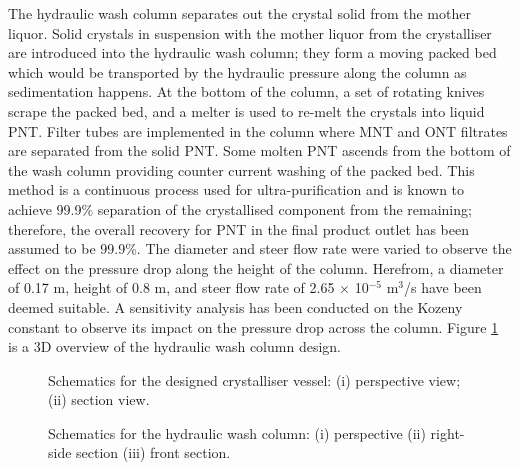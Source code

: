 The hydraulic wash column separates out the crystal solid from the mother liquor. Solid crystals in suspension with the mother liquor from the crystalliser are introduced into the hydraulic wash column; they form a moving packed bed which would be transported by the hydraulic pressure along the column as sedimentation happens. At the bottom of the column, a set of rotating knives scrape the packed bed, and a melter is used to re-melt the crystals into liquid PNT. Filter tubes are implemented in the column where MNT and ONT filtrates are separated from the solid PNT. Some molten PNT ascends from the bottom of the wash column providing counter current washing of the packed bed. This method is a continuous process used for ultra-purification and is known to achieve 99.9\% separation of the crystallised component from the remaining; therefore, the overall recovery for PNT in the final product outlet has been assumed to be 99.9\%. The diameter and steer flow rate were varied to observe the effect on the pressure drop along the height of the column. Herefrom, a diameter of 0.17 m, height of 0.8 m, and steer flow rate of 2.65 $\times$ 10$^{-5}$ m$^{3}$/s have been deemed suitable. A sensitivity analysis has been conducted on the Kozeny constant to observe its impact on the pressure drop across the column. Figure \ref{fig:wash column schematic executive} is a 3D overview of the hydraulic wash column design.


\begin{figure}[h]
    \centering
    \begin{minipage}{0.4\textwidth}
        
        \caption{Schematics for the designed crystalliser vessel: (i) perspective view; (ii) section view.}
        \label{fig:crystalliser schematic executive}
    \end{minipage}\hfill
    \begin{minipage}{0.55\textwidth}
        
        \caption{Schematics for the hydraulic wash column: (i) perspective (ii) right-side section (iii) front section.}
        \label{fig:wash column schematic executive}
    \end{minipage}
\end{figure}
